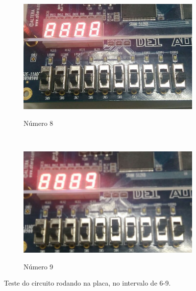 \begin{figure}[H]
			\begin{subfigure}[b]{0.44\textwidth}
				\includegraphics[width=\textwidth]{img/etapa1/8}
				\label{fig:etapa1-8}
				\caption{Número 8}
			\end{subfigure}
			~
			\begin{subfigure}[b]{0.44\textwidth}
				\includegraphics[width=\textwidth]{img/etapa1/9}
				\label{fig:etapa1-9}
				\caption{Número 9}
			\end{subfigure}

			\caption{Teste do circuito rodando na placa, no intervalo de 6-9.}\label{fig:etapa1Teste2}
		\end{figure}

